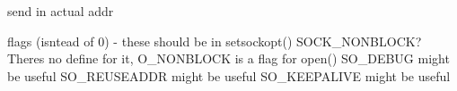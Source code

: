 
\begin{DoxyRefList}
\item[Member \mbox{\hyperlink{classHttpServer_abc9a3cc68d320d89544a257da11148d0}{Http\+Server\+::create\+Socket}} ()]\label{todo__todo000002}%
%
send in actual addr  
\item[Member \mbox{\hyperlink{classTcpSocket_a132aa72af141d611f8bad96ba585a79f}{Tcp\+Socket\+::Tcp\+Socket}} ()]\label{todo__todo000006}%
%
flags (isntead of 0) -\/ these should be in setsockopt() SOCK\+\_\+\+NONBLOCK? There\textquotesingle{}s no define for it, O\+\_\+\+NONBLOCK is a flag for open() SO\+\_\+\+DEBUG might be useful SO\+\_\+\+REUSEADDR might be useful SO\+\_\+\+KEEPALIVE might be useful 
\end{DoxyRefList}